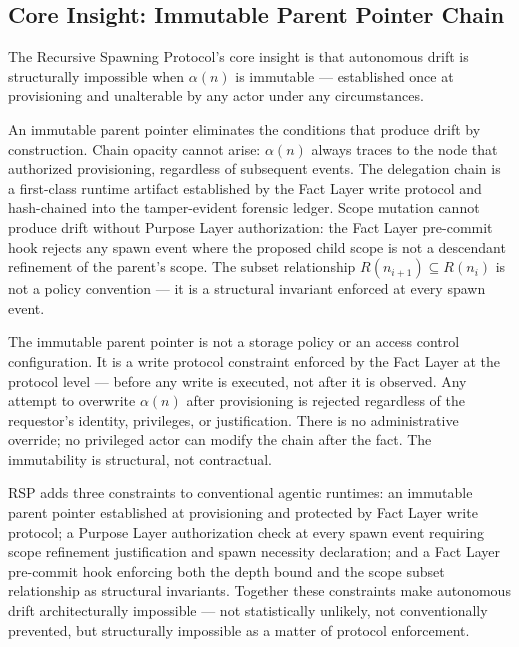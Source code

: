 \subsection{Core Insight: Immutable Parent Pointer Chain}

The Recursive Spawning Protocol's core insight is that autonomous drift is structurally impossible when $\alpha(n)$ is immutable — established once at provisioning and unalterable by any actor under any circumstances.

An immutable parent pointer eliminates the conditions that produce drift by construction. Chain opacity cannot arise: $\alpha(n)$ always traces to the node that authorized provisioning, regardless of subsequent events. The delegation chain is a first-class runtime artifact established by the Fact Layer write protocol and hash-chained into the tamper-evident forensic ledger. Scope mutation cannot produce drift without Purpose Layer authorization: the Fact Layer pre-commit hook rejects any spawn event where the proposed child scope is not a descendant refinement of the parent's scope. The subset relationship $R(n_{i+1}) \subseteq R(n_i)$ is not a policy convention — it is a structural invariant enforced at every spawn event.

The immutable parent pointer is not a storage policy or an access control configuration. It is a write protocol constraint enforced by the Fact Layer at the protocol level — before any write is executed, not after it is observed. Any attempt to overwrite $\alpha(n)$ after provisioning is rejected regardless of the requestor's identity, privileges, or justification. There is no administrative override; no privileged actor can modify the chain after the fact. The immutability is structural, not contractual.

RSP adds three constraints to conventional agentic runtimes: an immutable parent pointer established at provisioning and protected by Fact Layer write protocol; a Purpose Layer authorization check at every spawn event requiring scope refinement justification and spawn necessity declaration; and a Fact Layer pre-commit hook enforcing both the depth bound and the scope subset relationship as structural invariants. Together these constraints make autonomous drift architecturally impossible — not statistically unlikely, not conventionally prevented, but structurally impossible as a matter of protocol enforcement.

